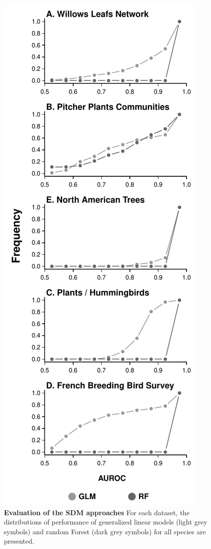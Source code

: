 \newpage

\begin{figure}[htbp]
\centering
\includegraphics{chapitre3/figS3.pdf}
\caption{\textbf{Evaluation of the SDM approaches} For each dataset, the
distributions of performance of generalized linear models (light grey
symbols) and random Forest (dark grey symbols) for all species are
presented.\label{fig:auc}}
\end{figure}

